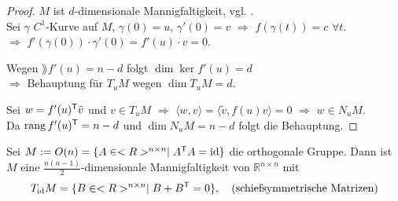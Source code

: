 \begin{proof}
	$M$ ist $d$-dimensionale Mannigfaltigkeit, vgl. .\\
	Sei $\gamma$ $C^1$-Kurve auf $M$, $\gamma(0) = u$, $\gamma'(0)= v$ $\Rightarrow$ $f(\gamma(t)) = c$ $\forall t$. \\
	\hspace*{1mm}$\Rightarrow$ $f'(\gamma(0)) \cdot \gamma'(0) = f'(u)\cdot v = 0$.
	
	Wegen $\rang f'(u)  = n - d$ folgt $\dim \ker f'(u) = d$\\
	\hspace*{1mm}$\Rightarrow$ Behauptung für $T_u M$ wegen $\dim T_u M = d$.
	
	Sei $w = f'(u)^\mathsf{T} \tilde{v}$ und $v\in T_u M$ $\Rightarrow$ $\langle w,v\rangle = \langle \tilde{v}, f(u)v \rangle = 0$ $\Rightarrow$ $w\in N_u M$.\\
	Da $\operatorname{rang} f'(u)^\mathsf{T} = n -d$ und $\dim N_u M = n - d$ folgt die Behauptung.
\end{proof}

\begin{example}
	Sei $M:= O(n) = \{ A\in<R>^{n\times n} \mid A^\mathsf{T}A = \operatorname{id} \}$ die orthogonale Gruppe. Dann ist $M$ eine $\frac{n(n-1)}{2}$-dimensionale Mannigfaltigkeit von $\mathbb{R}^{n\times n}$ mit \begin{align*}
		T_{\operatorname{id}} M = \{ B\in <R>^{n\times n} \mid B + B^\mathsf{T} = 0 \}, \quad \text{(schiefsymmetrische Matrizen)}
	\end{align*}
\end{example}

